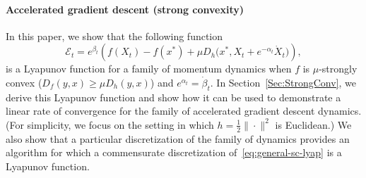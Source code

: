 \documentclass[11pt]{article}
\theoremstyle{plain}
\newcommand{\E}{{\mathcal E}}
\begin{document}
\paragraph{Accelerated gradient descent (strong convexity)}
In this paper, we show that the following function 
   \begin{equation}\label{eq:general-sc-lyap}
  \E_t =  e^{\beta_t} \left(f(X_t) - f(x^\ast) + \mu D_h\Big(x^\ast ,X_t + e^{-\alpha_t} \dot X_t\Big)\right),
 \end{equation}
is a Lyapunov function for a family of momentum dynamics when $f$ is $\mu$-strongly convex ($D_f(y,x) \geq \mu D_h(y,x)$) and $e^{\alpha_t} = \dot \beta_t$.  In Section~\ref{Sec:StrongConv}, we derive this Lyapunov function and show how it can be used to demonstrate a linear rate of convergence for the family of accelerated gradient descent dynamics.  (For simplicity, we focus on the setting in which $h = \frac{1}{2}\|\cdot\|^2$ is Euclidean.) We also show that a particular discretization of the family of dynamics provides an algorithm for which a commensurate discretization of~\eqref{eq:general-sc-lyap} is a Lyapunov function.

\end{document}
